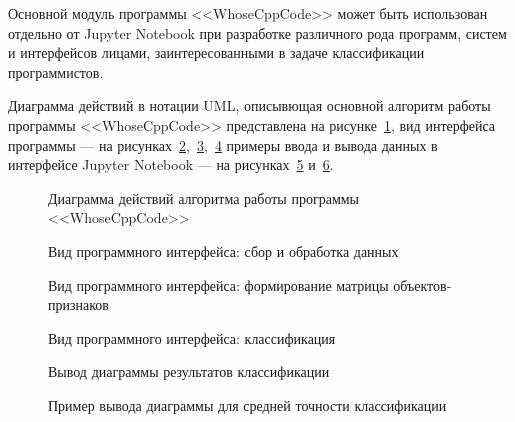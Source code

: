 Основной модуль программы <<WhoseCppCode>> может быть использован отдельно от Jupyter Notebook 
при разработке различного рода программ, систем и интерфейсов лицами, заинтересованными в задаче
классификации программистов.

Диаграмма действий в нотации UML, описывющая основной алгоритм работы программы <<WhoseCppCode>>
представлена на рисунке~\ref{flowchart:flowchart}, вид интерфейса программы --- 
на рисунках~\ref{user_notebook_1:user_notebook_1},~\ref{user_notebook_2:user_notebook_2},~\ref{user_notebook_3:user_notebook_3}
примеры ввода и вывода данных в интерфейсе Jupyter 
Notebook --- на рисунках~\ref{newplot:newplot} и~\ref{newplot2:newplot2}.
% 
\begin{figure}[ht!]
\caption{ Диаграмма действий алгоритма работы программы <<WhoseCppCode>> }
\label{flowchart:flowchart}
\end{figure}

\clearpage

\begin{figure}[ht!]
\caption{ Вид программного интерфейса: сбор и обработка данных }
\label{user_notebook_1:user_notebook_1}
\end{figure}


\begin{figure}[ht!]
\caption{ Вид программного интерфейса: формирование матрицы объектов-признаков }
\label{user_notebook_2:user_notebook_2}
\end{figure}

\clearpage

\begin{figure}[ht!]
\caption{ Вид программного интерфейса: классификация }
\label{user_notebook_3:user_notebook_3}
\end{figure}


\begin{figure}[h!]
\caption{ Вывод диаграммы результатов классификации }
\label{newplot:newplot}
\end{figure}


\begin{figure}[t!]
\caption{ Пример вывода диаграммы для средней точности классификации }
\label{newplot2:newplot2}
\end{figure}


\clearpage

